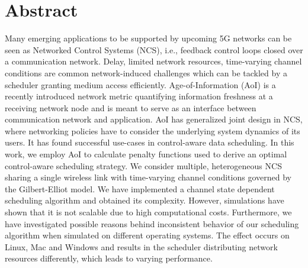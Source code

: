 \thispagestyle{plain}

\section*{Abstract}
Many emerging applications to be supported by upcoming 5G networks can be seen
as Networked Control Systems (NCS), i.e., feedback control loops closed over a
communication network. Delay, limited network resources, time-varying channel
conditions are common network-induced challenges which can be tackled by a
scheduler granting medium access efficiently. Age-of-Information (AoI) is a
recently introduced network metric quantifying information freshness at a
receiving network node and is meant to serve as an interface between
communication network and application. AoI has generalized joint design in NCS,
where networking policies have to consider the underlying system dynamics of its
users. It has found successful use-cases in control-aware data scheduling. In
this work, we employ AoI to calculate penalty functions used to derive an
optimal control-aware scheduling strategy. We consider multiple, heterogeneous
NCS sharing a single wireless link with time-varying channel conditions governed
by the Gilbert-Elliot model. We have implemented a channel state dependent
scheduling algorithm and obtained its complexity. However, simulations have
shown that it is not scalable due to high computational costs. Furthermore, we
have investigated possible reasons behind inconsistent behavior of our
scheduling algorithm when simulated on different operating systems. The effect
occurs on Linux, Mac and Windows and results in the scheduler distributing
network resources differently, which leads to varying performance.
